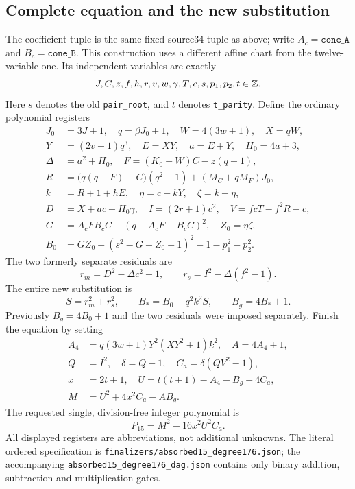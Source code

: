 \subsection{Complete equation and the new substitution}
The coefficient tuple is the same fixed source34 tuple as above; write
$A_c=\texttt{cone\_A}$ and $B_c=\texttt{cone\_B}$.
This construction uses a different affine chart from the twelve-variable
one. Its independent variables are exactly
\[
 J,C,z,f,h,r,v,w,\gamma,T,c,s,p_1,p_2,t\in\mathbb Z.
\]
Here $s$ denotes the old \texttt{pair\_root}, and $t$ denotes
\texttt{t\_parity}. Define the ordinary polynomial registers
\begin{align*}
 J_0&=3J+1,\quad q=\beta J_0+1,\quad W=4(3w+1),\quad X=qW,\\
 Y&=(2v+1)q^3,\quad E=XY,\quad a=E+Y,\quad H_0=4a+3,\\
 \Delta&=a^2+H_0,\quad F=(K_0+W)C-z(q-1),\\
 R&=\bigl(q(q-F)-C\bigr)(q^2-1)+(M_C+qM_F)J_0,\\
 k&=R+1+hE,\quad \eta=c-kY,\quad \zeta=k-\eta,\\
 D&=X+ac+H_0\gamma,\quad I=(2r+1)c^2,\quad V=fcT-f^2R-c,\\
 G&=A_cF B_cC-(q-A_cF-B_cC)^2,\quad Z_0=\eta\zeta,\\
 B_0&=GZ_0-(s^2-G-Z_0+1)^2-1-p_1^2-p_2^2.
\end{align*}
The two formerly separate residuals are
\[
 r_m=D^2-\Delta c^2-1,\qquad
 r_s=I^2-\Delta(f^2-1).
\]
The entire new substitution is
\begin{equation}
 S=r_m^2+r_s^2,\qquad
 B_*=B_0-q^2k^2S,\qquad
 B_g=4B_*+1.
 \label{eq:absorbed-guard}
\end{equation}
Previously $B_g=4B_0+1$ and the two residuals were imposed separately.
Finish the equation by setting
\begin{align*}
 A_4&=q(3w+1)Y^2(XY^2+1)k^2,\quad A=4A_4+1,\\
 Q&=I^2,\quad \delta=Q-1,\quad C_a=\delta(QV^2-1),\\
 x&=2t+1,\quad U=t(t+1)-A_4-B_g+4C_a,\\
 M&=U^2+4x^2C_a-AB_g.
\end{align*}
The requested single, division-free integer polynomial is
\begin{equation}
 \boxed{P_{15}=M^2-16x^2U^2C_a.}
 \label{eq:absorbed-fifteen}
\end{equation}
All displayed registers are abbreviations, not additional unknowns.
The literal ordered specification is
\texttt{finalizers/absorbed15\_degree176.json}; the accompanying
\texttt{absorbed15\_degree176\_dag.json} contains only binary
addition, subtraction and multiplication gates.


